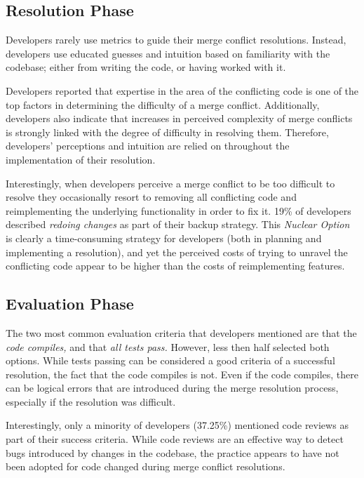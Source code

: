 \subsection{Resolution Phase}

Developers rarely use metrics to guide their merge conflict resolutions.
Instead, developers use educated guesses and intuition based on familiarity with the codebase; either from writing the code, or having worked with it.

Developers reported that expertise in the area of the conflicting code is one of the top factors in determining the difficulty of a merge conflict.
Additionally, developers also indicate that increases in perceived complexity of merge conflicts is strongly linked with the degree of difficulty in resolving them.
Therefore, developers' perceptions and intuition are relied on throughout the implementation of their resolution.

Interestingly, when developers perceive a merge conflict to be too difficult to resolve they occasionally resort to removing all conflicting code and reimplementing the underlying functionality in order to fix it.
19\% of developers described \textit{redoing changes} as part of their backup strategy.
This \textit{Nuclear Option} is clearly a time-consuming strategy for developers (both in planning and implementing a resolution), and yet the perceived costs of trying to unravel the conflicting code appear to be higher than the costs of reimplementing features.

\subsection{Evaluation Phase}

The two most common evaluation criteria that developers mentioned are that the \emph{code compiles,} and that \emph{all tests pass.}
However, less then half selected both options.
While tests passing can be considered a good criteria of a successful resolution, the fact that the code compiles is not.
Even if the code compiles, there can be logical errors that are introduced during the merge resolution process, especially if the resolution was difficult.

Interestingly, only a minority of developers (37.25\%) mentioned code reviews as part of their success criteria.
While code reviews are an effective way to detect bugs introduced by changes in the codebase, the practice appears to have not been adopted for code changed during merge conflict resolutions.

